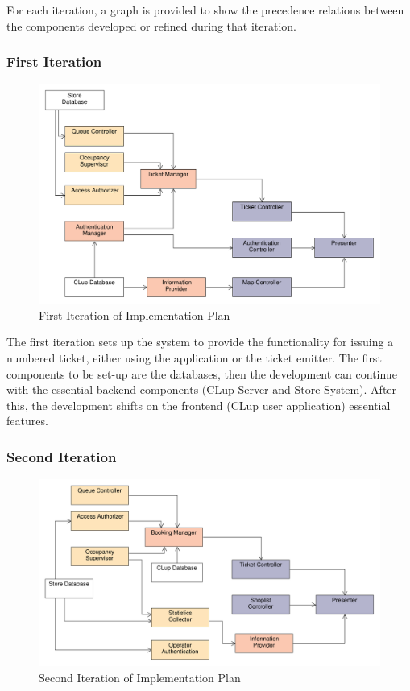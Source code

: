 For each iteration, a graph is provided to show the precedence relations between the components developed or refined during that iteration.

\clearpage

\subsubsection{First Iteration}
\begin{figure}[H]
    \includegraphics[width=\textwidth]{Images/Impl_Plan_1.pdf}
    \caption{\label{fig:UML_virtual_ticket_sequence}First Iteration of Implementation Plan}
\end{figure}

The first iteration sets up the system to provide the functionality for issuing a numbered ticket, either using the application or the ticket emitter. The first components to be set-up are the databases, then the development can continue with the essential backend components (CLup Server and Store System). After this, the development shifts on the frontend (CLup user application) essential features.

\clearpage

\subsubsection{Second Iteration}

\begin{figure}[H]
    \includegraphics[width=\textwidth]{Images/Impl_Plan_2.pdf}
    \caption{\label{fig:UML_virtual_ticket_sequence}Second Iteration of Implementation Plan}
\end{figure}

